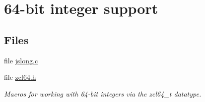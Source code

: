 \hypertarget{group__zcl__64}{}\section{64-\/bit integer support}
\label{group__zcl__64}
\subsection*{Files}
\begin{DoxyCompactItemize}
\item 
file \hyperlink{jslong_8c}{jslong.\+c}
\item 
file \hyperlink{zcl64_8h}{zcl64.\+h}
\begin{DoxyCompactList}\small\item\em Macros for working with 64-\/bit integers via the zcl64\+\_\+t datatype. \end{DoxyCompactList}\end{DoxyCompactItemize}
